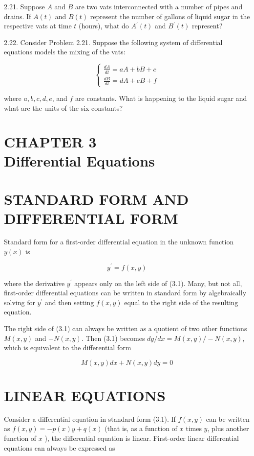 \documentclass[10pt]{article}
\begin{document}
2.21. Suppose $A$ and $B$ are two vats interconnected with a number of pipes and drains. If $A(t)$ and $B(t)$ represent the number of gallons of liquid sugar in the respective vats at time $t$ (hours), what do $A^{\prime}(t)$ and $B^{\prime}(t)$ represent?

2.22. Consider Problem 2.21. Suppose the following system of differential equations models the mixing of the vats:

\[
\left\{\begin{array}{l}
\frac{d A}{d t}=a A+b B+c  \tag{1}\\
\frac{d B}{d t}=d A+e B+f
\end{array}\right.
\]

where $a, b, c, d, e$, and $f$ are constants. What is happening to the liquid sugar and what are the units of the six constants?

\section*{CHAPTER 3 \\
 Differential Equations}
\section*{STANDARD FORM AND DIFFERENTIAL FORM}
Standard form for a first-order differential equation in the unknown function $y(x)$ is


\begin{equation*}
y^{\prime}=f(x, y) \tag{3.1}
\end{equation*}


where the derivative $y^{\prime}$ appears only on the left side of (3.1). Many, but not all, first-order differential equations can be written in standard form by algebraically solving for $y^{\prime}$ and then setting $f(x, y)$ equal to the right side of the resulting equation.

The right side of (3.1) can always be written as a quotient of two other functions $M(x, y)$ and $-N(x, y)$. Then (3.1) becomes $d y / d x=M(x, y) /-N(x, y)$, which is equivalent to the differential form


\begin{equation*}
M(x, y) d x+N(x, y) d y=0 \tag{3.2}
\end{equation*}


\section*{LINEAR EQUATIONS}
Consider a differential equation in standard form (3.1). If $f(x, y)$ can be written as $f(x, y)=-p(x) y+q(x)$ (that is, as a function of $x$ times $y$, plus another function of $x$ ), the differential equation is linear. First-order linear differential equations can always be expressed as
\end{document}
